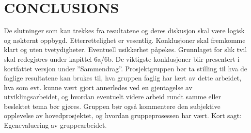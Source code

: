 \chapter{CONCLUSIONS}
De slutninger som kan trekkes fra resultatene og deres diskusjon skal være logisk og nøkternt
oppbygd. Etterrettelighet er vesentlig. Konklusjoner skal fremkomme klart og uten tvetydigheter.
Eventuell usikkerhet påpekes. Grunnlaget for slik tvil skal redegjøres under kapittel 6a/6b. De
viktigste konklusjoner blir presentert i kortfattet versjon under ”Sammendrag”.
Prosjektgruppen bør ta stilling til hva de faglige resultatene kan brukes til, hva gruppen
faglig har lært av dette arbeidet, hva som evt. kunne vært gjort annerledes ved en
gjentagelse av utviklingsarbeidet, og hvordan eventuelt videre arbeid rundt samme eller beslektet
tema bør gjøres. Gruppen bør også kommentere den subjektive opplevelse av hovedprosjektet, og
hvordan gruppeprosessen har vært. Kort sagt: Egenevaluering av gruppearbeidet.